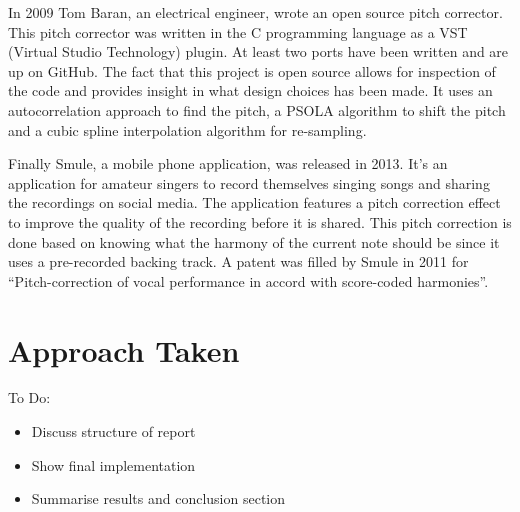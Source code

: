 In 2009 Tom Baran, an electrical engineer, wrote an open source pitch corrector.
This pitch corrector was written in the C programming language as a VST (Virtual
Studio Technology) plugin. At least two ports have been written and are up on
GitHub. The fact that this project is open source allows for inspection of the
code and provides insight in what design choices has been made. It uses an
autocorrelation approach to find the pitch, a PSOLA algorithm to shift the pitch
and a cubic spline interpolation algorithm for re-sampling\cite{AutoTalent}.

Finally Smule, a mobile phone application, was released in 2013. It's an
application for amateur singers to record themselves singing songs and sharing the
recordings on social media. The application features a pitch correction effect to
improve the quality of the recording before it is shared. This pitch correction is
done based on knowing what the harmony of the current note should be since it uses
a pre-recorded backing track. A patent was filled by Smule in 2011 for
``Pitch-correction of vocal performance in accord with score-coded
harmonies''\cite{SmulePatent}.

\section{Approach Taken}

\color{red}
To Do:
\begin{itemize}
	\item Discuss structure of report
	\item Show final implementation
	\item Summarise results and conclusion section
\end{itemize}
\color{black}
